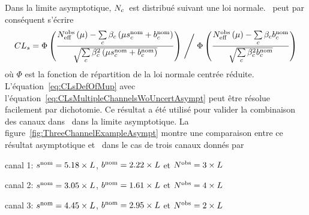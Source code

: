 Dans la limite asymptotique, $N_{c}$~est distribu\'e suivant une loi normale. 
\CLs~peut par cons\'equent s'\'ecrire
\begin{equation}
\label{eq:CLsMultipleChannelsWoUncertAsympt}
CL_s=\Phi\left(\frac{N^{\text{obs}}_\text{eff}\left(\mu\right)-\sum\limits_c\beta_c\left(\mu s_c^{\text{nom}}+b_{c}^{\text{nom}}\right)}{\sqrt{\sum\limits_c\beta_c^2\left(\mu s_c^{\text{nom}}+b_{c}^{\text{nom}}\right)}}\right)\Biggm/\Phi\left(\frac{N^{\text{obs}}_\text{eff}\left(\mu\right)-\sum\limits_c\beta_cb_{c}^{\text{nom}}}{\sqrt{\sum\limits_c\beta_c^2b_{c}^{\text{nom}}}}\right)
\end{equation}
o\`u $\Phi$ est la fonction de r\'epartition de la loi normale centr\'ee r\'eduite. L'\'equation~\ref{eq:CLsDefOfMup} avec l'\'equation~\ref{eq:CLsMultipleChannelsWoUncertAsympt} peut \^etre r\'esolue facilement par dichotomie. Ce r\'esultat a \'et\'e utilis\'e pour valider la combinaison des canaux dans \opthylic~dans la limite asymptotique. La figure~\ref{fig:ThreeChannelExampleAsympt} montre une comparaison entre ce r\'esultat asymptotique et \opthylic~dans le cas de trois canaux donn\'es par 
\begin{maliste}
\item canal 1: $s^{\text{nom}}=5.18\times L$, $b^{\text{nom}}=2.22\times L$ et $N^{\text{obs}}=3\times L$
\item canal 2: $s^{\text{nom}}=3.05\times L$, $b^{\text{nom}}=1.61\times L$ et $N^{\text{obs}}=4\times L$
\item canal 3: $s^{\text{nom}}=4.45\times L$, $b^{\text{nom}}=2.95\times L$ et $N^{\text{obs}}=2\times L$
\end{maliste}

